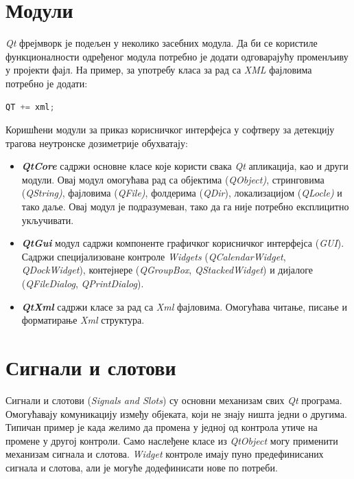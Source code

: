 \documentclass[12pt,a4paper,serbian,oneside]{book}
\begin{document}
\section{Модули}

\textit{Qt} фрејмворк је подељен у неколико засебних модула. Да би се користиле функционалности одређеног модула потребно је додати одговарајућу променљиву у пројекти фајл. На пример, за употребу класа за рад са \textit{XML} фајловима потребно је додати:

\begin{lstlisting}[language=C++,label=lst:pro,caption=Укључивање модула за рад са \textit{XML} фајловима]
QT += xml;
\end{lstlisting}

Коришћени модули за приказ корисничког интерфејса у софтверу за детекцију трагова неутронске дозиметрије обухватају:

\begin{itemize}

  \item \textbf{\textit{QtCore}} садржи основне класе које користи свака \textit{Qt} апликација, као и други модули. Овај модул омогућава рад са објектима (\textit{QObject)}, стринговима (\textit{QString)}, фајловима (\textit{QFile)}, фолдерима (\textit{QDir}), локализацијом (\textit{QLocle)} и тако даље. Овај модул је подразумеван, тако да га није потребно експлицитно укључивати.

  \item \textbf{\textit{QtGui}} модул садржи компоненте графичког корисничког интерфејса (\textit{GUI}). Садржи специјализоване контроле \textit{Widgets} (\textit{QCalendarWidget}, \textit{QDockWidget}), контејнере (\textit{QGroupBox}, \textit{QStackedWidget}) и дијалоге (\textit{QFileDialog}, \textit{QPrintDialog}).

  \item \textbf{\textit{QtXml}} садржи класе за рад са \textit{Xml} фајловима. Омогућава читање, писање и форматирање \textit{Xml} структура.

\end{itemize}

\section{Сигнали и слотови}

Сигнали и слотови (\textit{Signals and Slots}) су основни механизам свих \textit{Qt} програма. Омогућавају комуникацију између објеката, који не знају ништа једни о другима. Типичан пример је када желимо да промена у једној од контрола утиче на промене у другој контроли. Само наслеђене класе из \textit{QtObject} могу применити механизам сигнала и слотова. \textit{Widget} контроле имају пуно предефинисаних сигнала и слотова, али је могуће додефинисати нове по потреби.
\end{document}
